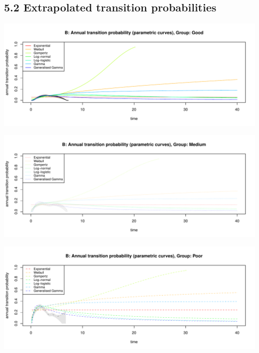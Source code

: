 \documentclass[
]{article}
\begin{document}
\clearpage

\subsection{5.2 Extrapolated transition
probabilities}\label{extrapolated-transition-probabilities}

\begin{flushleft}\includegraphics[height=0.29\textheight]{BC_OS_output/Images/Figure_validate_extrapolation_tp-1} \end{flushleft}

\begin{flushleft}\includegraphics[height=0.29\textheight]{BC_OS_output/Images/Figure_validate_extrapolation_tp-2} \end{flushleft}

\begin{flushleft}\includegraphics[height=0.29\textheight]{BC_OS_output/Images/Figure_validate_extrapolation_tp-3} \end{flushleft}
\end{document}
